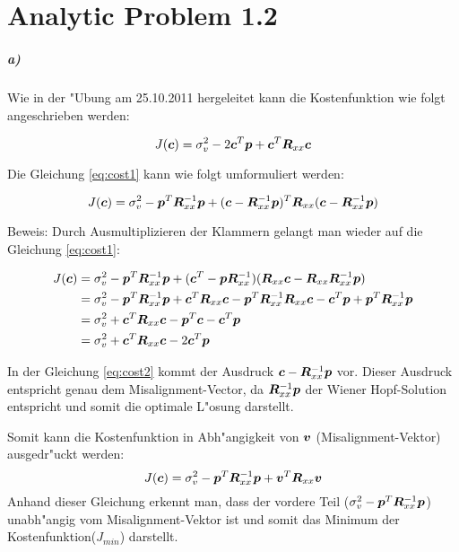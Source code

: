 \clearpage
\chapter{Analytic Problem 1.2}

\paragraph{a)}
Wie in der "Ubung am 25.10.2011 hergeleitet kann die Kostenfunktion wie folgt angeschrieben werden:

\begin{equation}
 J(\bm{c}) = \sigma_v^2 - 2\bm{c}^T \bm{p} + \bm{c}^T\bm{R}_{xx}\bm{c}
\label{eq:cost1}
\end{equation}

Die Gleichung \ref{eq:cost1} kann wie folgt umformuliert werden:

\begin{equation}
 J(\bm{c}) = \sigma_v^2 - \bm{p}^T\bm{R}_{xx}^{-1}\bm{p} + (\bm{c} - \bm{R}_{xx}^{-1}\bm{p})^T\bm{R}_{xx}(\bm{c} - \bm{R}_{xx}^{-1}\bm{p})
\label{eq:cost2}
\end{equation}


Beweis: Durch Ausmultiplizieren der Klammern gelangt man wieder auf die Gleichung \ref{eq:cost1}:

\begin{align}
 J(\bm{c}) &= \sigma_v^2 - \bm{p}^T\bm{R}_{xx}^{-1}\bm{p} + (\bm{c}^T - \bm{p}\bm{R}_{xx}^{-1})(\bm{R}_{xx}\bm{c} - \bm{R}_{xx}\bm{R}_{xx}^{-1}\bm{p}) \\
  &=  \sigma_v^2 - \bm{p}^T\bm{R}_{xx}^{-1}\bm{p} + \bm{c}^T\bm{R}_{xx}\bm{c} - \bm{p}^T\bm{R}_{xx}^{-1}\bm{R}_{xx}\bm{c} - \bm{c}^T\bm{p} + \bm{p}^T\bm{R}_{xx}^{-1}\bm{p} \\
  &=  \sigma_v^2 + \bm{c}^T\bm{R}_{xx}\bm{c} - \bm{p}^T\bm{c} - \bm{c}^T\bm{p} \\
  &=  \sigma_v^2 + \bm{c}^T\bm{R}_{xx}\bm{c} - 2 \bm{c}^T\bm{p}
\label{eq:cost_beweis}
\end{align}

In der Gleichung \ref{eq:cost2} kommt der Ausdruck $\bm{c} - \bm{R}_{xx}^{-1}\bm{p}$ vor. Dieser Ausdruck entspricht
genau dem Misalignment-Vector, da $\bm{R}_{xx}^{-1}\bm{p}$ der Wiener Hopf-Solution entspricht und somit die optimale
L"osung darstellt.

Somit kann die Kostenfunktion in Abh"angigkeit von $\bm{v}$ (Misalignment-Vektor) ausgedr"uckt werden:
\begin{equation}
 J(\bm{c}) = \sigma_v^2 - \bm{p}^T\bm{R}_{xx}^{-1}\bm{p} + \bm{v}^T\bm{R}_{xx}\bm{v}
\label{eq:cost3}
\end{equation}
Anhand dieser Gleichung erkennt man, dass der vordere Teil ($\sigma_v^2 - \bm{p}^T\bm{R}_{xx}^{-1}\bm{p}$)
unabh"angig vom Misalignment-Vektor ist und somit das Minimum der Kostenfunktion($J_{min}$) darstellt.

